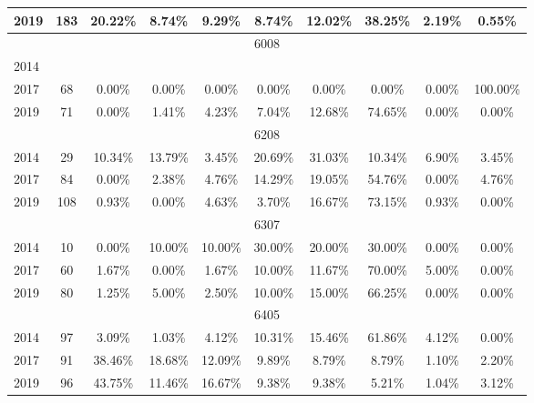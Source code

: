 \begin{table}[H]
\begin{tabular}{|l|c|ccc|ccc|cc|}
2019 & 183 & 20.22\% & 8.74\% & 9.29\% & 8.74\% & 12.02\% & 38.25\% & 2.19\% & 0.55\%\\
\hline
\hline
\multicolumn{10}{|c|}{6008}\\
\hline
2014 & & & & & & & & & \\
2017 & 68 & 0.00\% & 0.00\% & 0.00\% & 0.00\% & 0.00\% & 0.00\% & 0.00\% & 100.00\%\\
2019 & 71 & 0.00\% & 1.41\% & 4.23\% & 7.04\% & 12.68\% & 74.65\% & 0.00\% & 0.00\%\\
\hline
\hline
\multicolumn{10}{|c|}{6208}\\
\hline
2014 & 29 & 10.34\% & 13.79\% & 3.45\% & 20.69\% & 31.03\% & 10.34\% & 6.90\% & 3.45\%\\
2017 & 84 & 0.00\% & 2.38\% & 4.76\% & 14.29\% & 19.05\% & 54.76\% & 0.00\% & 4.76\%\\
2019 & 108 & 0.93\% & 0.00\% & 4.63\% & 3.70\% & 16.67\% & 73.15\% & 0.93\% & 0.00\%\\
\hline
\hline
\multicolumn{10}{|c|}{6307}\\
\hline
2014 & 10 & 0.00\% & 10.00\% & 10.00\% & 30.00\% & 20.00\% & 30.00\% & 0.00\% & 0.00\%\\
2017 & 60 & 1.67\% & 0.00\% & 1.67\% & 10.00\% & 11.67\% & 70.00\% & 5.00\% & 0.00\%\\
2019 & 80 & 1.25\% & 5.00\% & 2.50\% & 10.00\% & 15.00\% & 66.25\% & 0.00\% & 0.00\%\\
\hline
\hline
\multicolumn{10}{|c|}{6405}\\
\hline
2014 & 97 & 3.09\% & 1.03\% & 4.12\% & 10.31\% & 15.46\% & 61.86\% & 4.12\% & 0.00\%\\
2017 & 91 & 38.46\% & 18.68\% & 12.09\% & 9.89\% & 8.79\% & 8.79\% & 1.10\% & 2.20\%\\
2019 & 96 & 43.75\% & 11.46\% & 16.67\% & 9.38\% & 9.38\% & 5.21\% & 1.04\% & 3.12\%\\
\hline
\bottomrule
\end{tabular}
\end{table}
